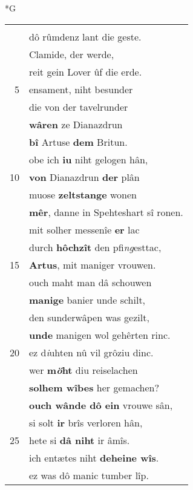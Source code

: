 \documentclass[8pt,a4paper,notitlepage]{article}
\begin{document}
\newpage
\begin{table}[ht]
\begin{minipage}[t]{0.5\linewidth}
\small
\begin{center}*G
\end{center}
\begin{tabular}{rl}
 & \textbf{\begin{large}V\end{large}uorter} an \textbf{ir} reste.\\ 
 & dô rûmdenz lant die geste.\\ 
 & Clamide, der werde,\\ 
 & reit gein Lover ûf die erde.\\ 
5 & ensament, niht besunder\\ 
 & die von der tavelrunder\\ 
 & \textbf{wâren} ze Dianazdrun\\ 
 & \textbf{bî} Artuse \textbf{dem} Britun.\\ 
 & obe ich \textbf{iu} niht gelogen hân,\\ 
10 & \textbf{von} Dianazdrun \textbf{der} plân\\ 
 & muose \textbf{zeltstange} wonen\\ 
 & \textbf{mêr}, danne in Spehteshart sî ronen.\\ 
 & mit solher messenîe \textbf{er} lac\\ 
 & durch \textbf{hôchzît} den pfi\textit{ng}esttac,\\ 
15 & \textbf{Artus}, mit maniger vrouwen.\\ 
 & ouch maht man dâ schouwen\\ 
 & \textbf{manige} banier unde schilt,\\ 
 & den sunderwâpen was gezilt,\\ 
 & \textbf{unde} manigen wol gehêrten rinc.\\ 
20 & ez d\textit{i}uhten nû vil grôziu dinc.\\ 
 & wer \textbf{m\textit{ö}ht} diu reiselachen\\ 
 & \textbf{solhem wîbes} her gemachen?\\ 
 & \textbf{ouch wânde dô ein} vrouwe sân,\\ 
 & si solt \textbf{ir} brîs verloren hân,\\ 
25 & hete si \textbf{dâ niht} ir âmîs.\\ 
 & ich entætes niht \textbf{deheine wîs}.\\ 
 & ez was dô manic tumber lîp.\\ 

\end{tabular}
\end{minipage}
\end{table}
\end{document}
